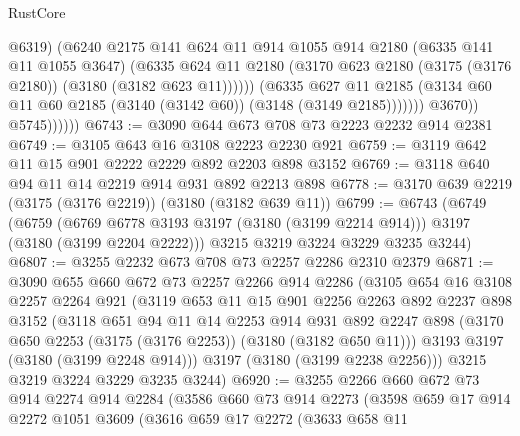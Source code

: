 \begin{lexlean}{RustCore}
\begin{coremodule}
                              @6319)
                            (@6240
                              @2175
                              @141
                              @624
                              @11
                              @914
                              @1055
                              @914
                              @2180
                              (@6335 @141 @11 @1055 @3647)
                              (@6335
                                @624
                                @11
                                @2180
                                (@3170 @623 @2180 (@3175 (@3176 @2180)) (@3180 (@3182 @623 @11))))))
                          (@6335
                            @627
                            @11
                            @2185
                            (@3134 @60 @11 @60 @2185 (@3140 (@3142 @60)) (@3148 (@3149 @2185)))))))
                    @3670))
                @5745))))))
@6743 := @3090 @644 @673 @708 @73 @2223 @2232 @914 @2381
@6749 := @3105 @643 @16 @3108 @2223 @2230 @921
@6759 := @3119 @642 @11 @15 @901 @2222 @2229 @892 @2203 @898 @3152
@6769 := @3118 @640 @94 @11 @14 @2219 @914 @931 @892 @2213 @898
@6778 := @3170 @639 @2219 (@3175 (@3176 @2219)) (@3180 (@3182 @639 @11))
@6799 := @6743
    (@6749
      (@6759 (@6769 @6778 @3193 @3197 (@3180 (@3199 @2214 @914))) @3197 (@3180 (@3199 @2204 @2222)))
      @3215
      @3219
      @3224
      @3229
      @3235
      @3244)
@6807 := @3255 @2232 @673 @708 @73 @2257 @2286 @2310 @2379
@6871 := @3090
    @655
    @660
    @672
    @73
    @2257
    @2266
    @914
    @2286
    (@3105
      @654
      @16
      @3108
      @2257
      @2264
      @921
      (@3119
        @653
        @11
        @15
        @901
        @2256
        @2263
        @892
        @2237
        @898
        @3152
        (@3118
          @651
          @94
          @11
          @14
          @2253
          @914
          @931
          @892
          @2247
          @898
          (@3170 @650 @2253 (@3175 (@3176 @2253)) (@3180 (@3182 @650 @11)))
          @3193
          @3197
          (@3180 (@3199 @2248 @914)))
        @3197
        (@3180 (@3199 @2238 @2256)))
      @3215
      @3219
      @3224
      @3229
      @3235
      @3244)
@6920 := @3255
    @2266
    @660
    @672
    @73
    @914
    @2274
    @914
    @2284
    (@3586
      @660
      @73
      @914
      @2273
      (@3598
        @659
        @17
        @914
        @2272
        @1051
        @3609
        (@3616
          @659
          @17
          @2272
          (@3633
            @658
            @11

\end{coremodule}
\end{lexlean}

